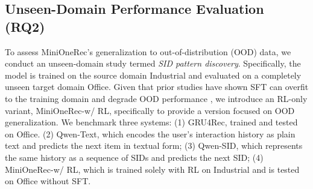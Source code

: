 
\subsection{Unseen-Domain Performance Evaluation (RQ2)}

To assess MiniOneRec's generalization to out-of-distribution (OOD) data, we conduct an unseen-domain study termed \emph{SID pattern discovery}. 
Specifically, the model is trained on the source domain Industrial and evaluated on a completely unseen target domain Office. Given that prior studies have shown SFT can overfit to the training domain and degrade OOD performance \citep{RLvsSFT, RLReallyLearn, SFT-then-RL, RevisitingRL}, we introduce an RL-only variant, MiniOneRec-w/ RL, specifically to provide a version focused on OOD generalization. We benchmark three systems:  
(1) GRU4Rec, trained and tested on Office.
(2) Qwen-Text, which encodes the user’s interaction history as plain text and predicts the next item in textual form;  
(3) Qwen-SID, which represents the same history as a sequence of SIDs and predicts the next SID;  
(4) MiniOneRec-w/ RL, which is trained solely with RL on Industrial and is tested on Office without SFT.  

